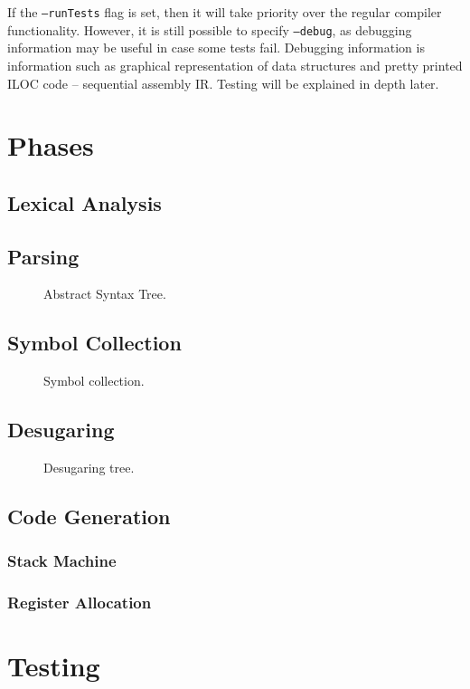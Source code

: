 If the \texttt{--runTests} flag is set, then it will take priority over the regular compiler functionality. However, it is still possible to specify \texttt{--debug}, as debugging information may be useful in case some tests fail. Debugging information is information such as graphical representation of data structures and pretty printed ILOC code -- sequential assembly IR. Testing will be explained in depth later.

\chapter{Phases}
\section{Lexical Analysis}
\section{Parsing}
\begin{figure}[H]
    \centering
    
    \caption{Abstract Syntax Tree.} 
\end{figure}
\section{Symbol Collection}
\begin{figure}[H]
    \centering
    
    \caption{Symbol collection.} 
\end{figure}
\section{Desugaring}
\begin{figure}[H]
    \centering
    
    \caption{Desugaring tree.} 
\end{figure}
\section{Code Generation} 
\subsection{Stack Machine}
\subsection{Register Allocation}

\chapter{Testing}
